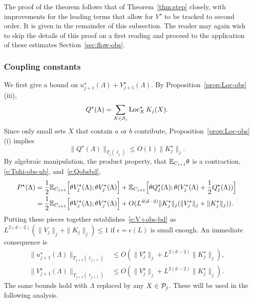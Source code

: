 \documentclass[11pt]{amsart}
\numberwithin{equation}{section}
\numberwithin{theorem}{section}
\newcommand{\1}{{\bf 1}}
\newcommand{\obs}{\star}
\newcommand{\Vobs}{V^\obs}
\newcommand{\Kobs}{K^\obs}
\newcommand{\Loc}{\operatorname{Loc}}
\begin{document}
The proof of the theorem follows that of Theorem~\ref{thm:step} closely,
with improvements for the leading terms
that allow for $\Vobs$ to be tracked to second order.
%
It is given in the remainder of this subsection.
The reader may again wish to skip the details of this proof on a first reading
and proceed to the application of these estimates Section~\ref{sec:flow-obs}.

\subsubsection{Coupling constants}

We first give a bound on
$u^{\obs}_{j+1}(\Lambda)+ \Vobs_{j+1}(\Lambda)$.   By
Proposition~\ref{prop:Loc-obs} (iii), 
\begin{equation}
  Q^{\obs}(\Lambda) =
  \sum_{X\in\cS_{j}}\Loc^{\obs}_{X}
  K_{j}(X).
\end{equation}
Since only small sets $X$ that contain $a$ or $b$ contribute,
Proposition~\ref{prop:Loc-obs} (i) implies
\begin{equation}
  \label{e:Qobsbd}
  \|Q^{\obs}(\Lambda)\|_{T_{j}(\ell_{j})}\leq  O(1)
  \|\Kobs_j\|_{j}. 
\end{equation} 
%
By algebraic manipulation, the product property, 
that $\mathbb{E}_{C_{j+1}}\theta$ is a contraction,
\eqref{e:Tphi-obs-ub}, and~\eqref{e:Qobsbd}, 
\begin{align}
  P^{\obs}(\Lambda)
  &= \frac{1}{2}\E_{C_{j+1}}\qB{\theta V^{\obs}_{j}(\Lambda);\theta V^{\obs}_{j}(\Lambda)}
    +\E_{C_{j+1}}\qB{\theta Q^{\obs}_{j}(\Lambda);\theta
    (V^{\obs}_{j}(\Lambda)+\frac12 Q^\obs_j(\Lambda))}
    \nnb
  &= \frac{1}{2}\E_{C_{j+1}}\qB{\theta V^{\obs}_{j}(\Lambda);\theta V^{\obs}_{j}(\Lambda)}
    + O(L^{4(d-2)}\|\Kobs_{j}\|_{j} (\|\Vobs_{j}\|_{j}+\|\Kobs_{j}\|_{j})).
\end{align}
Putting these pieces together establishes~\eqref{e:V+obs-bd} as
$L^{2(d-2)}(\|V_{j}\|_{j}+\|K_{j}\|_{j})\leq 1$ if
$\epsilon=\epsilon(L)$ is small enough.
An immediate consequence is
\begin{align}
  \label{e:uobs+}
  \|u^{\obs}_{j+1}(\Lambda)\|_{T_{j+1}(\ell_{j+1})} 
  &\leq O(\|\Vobs_{j}\|_{j} + L^{2(d-2)}\|\Kobs_{j}\|_{j}), \\
  \label{e:vobs+}
  \|\Vobs_{j+1}(\Lambda)\|_{T_{j+1}(\ell_{j+1})} 
  &\leq O(\|\Vobs_{j}\|_{j} + L^{2(d-2)}\|\Kobs_{j}\|_{j}).
\end{align}
The same bounds hold with $\Lambda$ replaced by any $X\in\mathcal P_j$.
These will be used in the following analysis.
\end{document}
